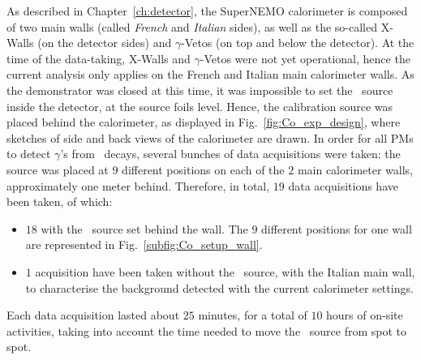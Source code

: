 As described in Chapter~\ref{ch:detector}, the SuperNEMO calorimeter is composed of two main walls (called \emph{French} and \emph{Italian} sides), as well as the so-called X-Walls (on the detector sides) and $\gamma$-Vetos (on top and below the detector).
At the time of the data-taking, X-Walls and $\gamma$-Vetos were not yet operational, hence the current analysis only applies on the French and Italian main calorimeter walls.
As the demonstrator was closed at this time, it was impossible to set the \Co\ source inside the detector, at the source foils level.
Hence, the calibration source was placed behind the calorimeter, as displayed in Fig.~\ref{fig:Co_exp_design}, where sketches of side and back views of the calorimeter are drawn.
In order for all PMs to detect $\gamma$'s from \Co\ decays, several bunches of data acquisitions were taken:
the source was placed at $9$ different positions on each of the $2$ main calorimeter walls, approximately one meter behind.
Therefore, in total, $19$ data acquisitions have been taken, of which:
\begin{itemize}
\item $18$ with the \Co\ source set behind the wall. The $9$ different positions for one wall are represented in Fig.~\ref{subfig:Co_setup_wall}.
\item $1$ acquisition have been taken without the \Co\ source, with the Italian main wall, to characterise the background detected with the current calorimeter settings.
\end{itemize}
Each data acquisition lasted about $25$ minutes, for a total of $10$ hours of on-site activities, taking into account the time needed to move the \Co\ source from spot to spot.
